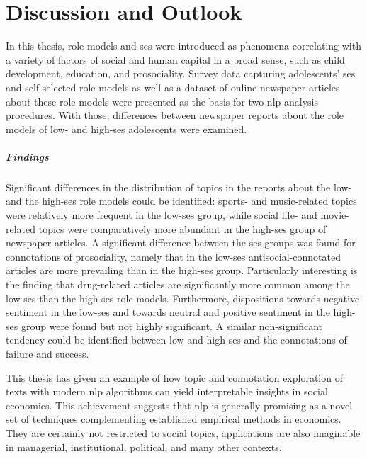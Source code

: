 \renewcommand{\imagepath}{../80-outro/img}

\chapter{Discussion and Outlook}
In this thesis, role models and \gls{ses} were introduced as phenomena correlating with a variety of factors of social and human capital in a broad sense, such as child development, education, and prosociality. Survey data capturing adolescents' \gls{ses} and self-selected role models as well as a dataset of online newspaper articles about these role models were presented as the basis for two \gls{nlp} analysis procedures. With those, differences between newspaper reports about the role models of low- and high-\gls{ses} adolescents were examined.

\paragraph{Findings}
Significant differences in the distribution of topics in the reports about the low- and the high-\gls{ses} role models could be identified: sports- and music-related topics were relatively more frequent in the low-\gls{ses} group, while social life- and movie-related topics were comparatively more abundant in the high-\gls{ses} group of newspaper articles. A significant difference between the \gls{ses} groups was found for connotations of prosociality, namely that in the low-\gls{ses} antisocial-connotated articles are more prevailing than in the high-\gls{ses} group. Particularly interesting is the finding that drug-related articles are significantly more common among the low-\gls{ses} than the high-\gls{ses} role models. Furthermore, dispositions towards negative sentiment in the low-\gls{ses} and towards neutral and positive sentiment in the high-\gls{ses} group were found but not highly significant. A similar non-significant tendency could be identified between low and high \gls{ses} and the connotations of failure and success.

This thesis has given an example of how topic and connotation exploration of texts with modern \gls{nlp} algorithms can yield interpretable insights in social economics. This achievement suggests that \gls{nlp} is generally promising as a novel set of techniques complementing established empirical methods in economics. They are certainly not restricted to social topics, applications are also imaginable in managerial, institutional, political, and many other contexts.



